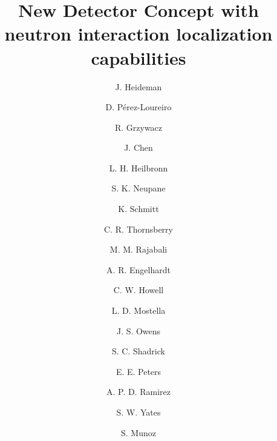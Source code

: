 \documentclass[preprint,3p,twocolumn]{elsarticle}
\begin{document}
\begin{frontmatter}

\title{New Detector Concept with neutron interaction localization capabilities}


\author[mymainaddress]{J. Heideman}
\author[mymainaddress]{D. P\'erez-Loureiro}

\author[mymainaddress,ORNLaddress]{R. Grzywacz}
\author[mymainaddress]{J. Chen}
\author[UTKNEaddress]{L. H. Heilbronn}
\author[mymainaddress]{S. K. Neupane}
\author[mymainaddress]{K. Schmitt}
\author[mymainaddress]{C. R. Thornsberry}

\author[TTUaddress]{M. M. Rajabali}
\author[TTUaddress]{A. R. Engelhardt}
\author[TTUaddress]{C. W. Howell}
\author[TTUaddress]{L. D. Mostella}
\author[TTUaddress]{J. S. Owens}
\author[TTUaddress]{S. C. Shadrick}
\author[UKaddress]{E. E. Peters}
\author[UKaddress]{A. P. D. Ramirez}
\author[UKaddress]{S. W. Yates}
\author[JINPAaddress]{S. Munoz}






\address[mymainaddress]{Department of Physics and Astronomy,  University of Tennessee, Knoxville, Tennessee , 37996 USA}
\address[UTKNEaddress]{Department of Nuclear Engineering,  University of Tennessee, Knoxville, Tennessee , 37996 USA}
\address[ORNLaddress]{Physics Division, Oak Ridge National Laboratory, Oak Ridge TN 37831 USA}
\address[TTUaddress]{Department of Physics Tennessee Technological University, Cookeville, Tennessee, 38505, USA}
\address[JINPAaddress]{Joint Institute for Nuclear Physics and Applications, Oak Ridge TN 37831 USA}
\address[UKaddress]{Department of Physics and Astronomy and Chemistry, University of Kentucky, Lexington, Kentucky, 40506 USA}




\end{frontmatter}
\end{document}
